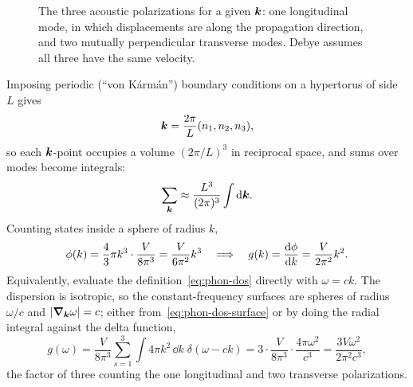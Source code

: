 \begin{figure}[ht]
\centering
{}
\caption{The three acoustic polarizations for a given $\bm{k}$: one longitudinal mode, in which displacements are along the propagation direction, and two mutually perpendicular transverse modes. Debye assumes all three have the same velocity.}
\label{fig:phon-polarizations}
\end{figure}

Imposing periodic (``von K\'arm\'an'') boundary conditions on a hypertorus of side $L$ gives
\begin{equation}
    \bm{k} = \frac{2\pi}{L}(n_1, n_2, n_3),
\end{equation}
so each $\bm{k}$-point occupies a volume $(2\pi/L)^3$ in reciprocal space, and sums over modes become integrals:
\begin{equation}
    \sum_{\bm{k}} \approx \frac{L^3}{(2\pi)^3}\int \dd\bm{k}.
\end{equation}
Counting states inside a sphere of radius $k$,
\begin{equation}
    \phi(k) = \frac{4}{3}\pi k^3 \cdot \frac{V}{8\pi^3} = \frac{V}{6\pi^2}k^3
    \quad\Longrightarrow\quad
    g(k) = \dv{\phi}{k} = \frac{V}{2\pi^2}k^2.
\end{equation}
Equivalently, evaluate the definition~\eqref{eq:phon-dos} directly with $\omega = ck$. The dispersion is isotropic, so the constant-frequency surfaces are spheres of radius $\omega/c$ and $|\grad_{\bm{k}}\omega| = c$; either from~\eqref{eq:phon-dos-surface} or by doing the radial integral against the delta function,
\begin{equation}
    g(\omega) = \frac{V}{8\pi^3}\sum_{s=1}^{3}\int 4\pi k^2\,\dd k\;\delta(\omega - ck)
    = 3\cdot\frac{V}{8\pi^3}\cdot\frac{4\pi\omega^2}{c^3}
    = \frac{3V\omega^2}{2\pi^2 c^3},
\end{equation}
the factor of three counting the one longitudinal and two transverse polarizations.

